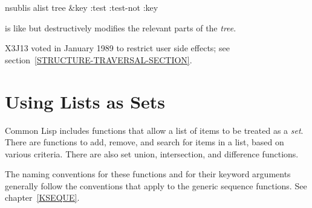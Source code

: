 \begin{defun}[Function]
nsublis alist tree &key :test :test-not :key

 is like  but destructively modifies the relevant
parts of the {\it tree}.

\begin{new}
X3J13 voted in January 1989
to restrict user side effects; see section~\ref{STRUCTURE-TRAVERSAL-SECTION}.
\end{new}
\end{defun}

\section{Using Lists as Sets}

Common Lisp includes functions that allow a list of items to be
treated as a {\it set}.
There are functions to add, remove, and search for items in a list,
based on various criteria.
There are also set union, intersection, and difference functions.

The naming conventions for these functions and for their keyword
arguments generally follow the conventions that apply to the generic sequence
functions.  See chapter~\ref{KSEQUE}.

